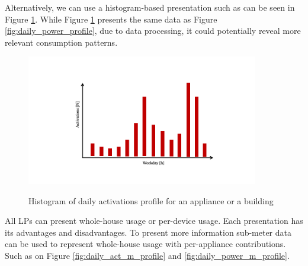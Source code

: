 Alternatively, we can use a histogram-based presentation such as can be seen in Figure \ref{fig:daily_act_profile}.
While Figure \ref{fig:daily_act_profile} presents the same data as Figure \ref{fig:daily_power_profile},
due to data processing, it could potentially reveal more relevant consumption patterns.

\begin{figure}[H]
	\centering
	\caption{Histogram of daily activations profile for an appliance or a building}
	\includegraphics[width=0.9\textwidth]{Figures/profile_sketches/Slide5.png}
	\label{fig:daily_act_profile}
\end{figure}

All LPs can present whole-house usage or per-device usage. Each presentation has its advantages and disadvantages. 
To present more information sub-meter data can be used to represent whole-house usage with per-appliance contributions.
Such as on Figure \ref{fig:daily_act_m_profile} and \ref{fig:daily_power_m_profile}.

